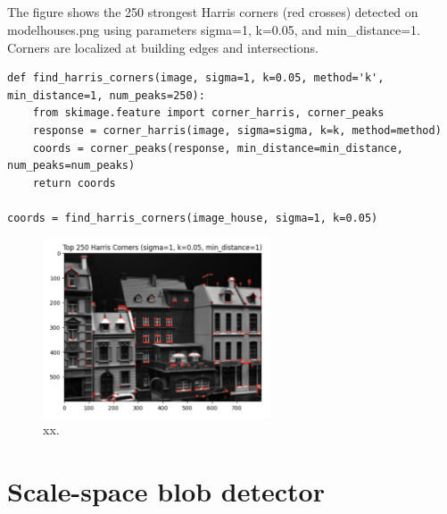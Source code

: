 \documentclass[12pt]{article}
\begin{document}
\subsection{}

The figure shows the 250 strongest Harris corners (red crosses) detected on modelhouses.png using parameters sigma=1, k=0.05, and min\_distance=1. Corners are localized at building edges and intersections.

\begin{lstlisting}
def find_harris_corners(image, sigma=1, k=0.05, method='k', min_distance=1, num_peaks=250):
    from skimage.feature import corner_harris, corner_peaks
    response = corner_harris(image, sigma=sigma, k=k, method=method)
    coords = corner_peaks(response, min_distance=min_distance, num_peaks=num_peaks)
    return coords

coords = find_harris_corners(image_house, sigma=1, k=0.05)
\end{lstlisting}

\begin{figure}[h]
    \centering
    \includegraphics[width=0.6\textwidth]{pics/a5-3.3} 
    \caption{xx.}
\end{figure}

\section{Scale-space blob detector}
\end{document}
